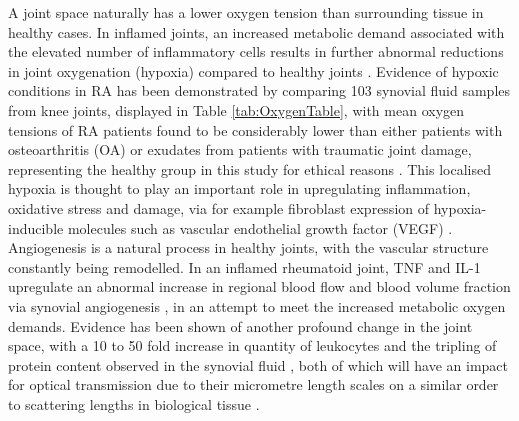 \documentclass[twoside]{bhamthesis}
\theoremstyle{definition}
\begin{document}
A joint space naturally has a lower oxygen tension than surrounding tissue in healthy cases. In inflamed joints, an increased metabolic demand associated with the elevated number of inflammatory cells results in further abnormal reductions in joint oxygenation (hypoxia) compared to healthy joints \cite{ng2010synovial}. Evidence of hypoxic conditions in RA has been demonstrated by comparing 103 synovial fluid samples from knee joints, displayed in Table \ref{tab:OxygenTable}, with mean oxygen tensions of RA patients found to be considerably lower than either patients with osteoarthritis (OA) or exudates from patients with traumatic joint damage, representing the healthy group in this study for ethical reasons \cite{lund1970oxygen}. This localised hypoxia is thought to play an important role in upregulating inflammation, oxidative stress and damage, via for example fibroblast expression of hypoxia-inducible molecules such as vascular endothelial growth factor (VEGF) \cite{konisti2012hypoxia, akhavani2009hypoxia}. Angiogenesis is a natural process in healthy joints, with the vascular structure constantly being remodelled. In an inflamed rheumatoid joint, TNF and IL-1 upregulate an abnormal increase in regional blood flow and blood volume fraction via synovial angiogenesis \cite{falchuk1970respiratory}, in an attempt to meet the increased metabolic oxygen demands. Evidence has been shown of another profound change in the joint space, with a 10 to 50 fold increase in quantity of leukocytes and the tripling of protein content observed in the synovial fluid \cite{mohamed1990morphology,dahlberg1992proteoglycan}, both of which will have an impact for optical transmission due to their micrometre length scales on a similar order to scattering lengths in biological tissue .
\end{document}
